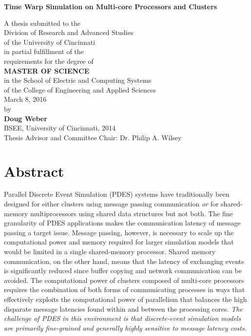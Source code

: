 \documentclass[11pt]{book}
\begin{document}
\thispagestyle{empty}

\doublespacing

\vspace*{0.5in}

\begin{center}
\LARGE{\textbf{Time Warp Simulation on Multi-core Processors and Clusters}}

\vspace*{0.4in}

  {\large A thesis submitted to the\\[0.20in]
    Division of Research and Advanced Studies\\
    of the University of Cincinnati\\[0.20in]
    in partial fulfillment of the\\
    requirements for the degree of\\[0.20in]
    \textbf{MASTER OF SCIENCE}\\[0.20in]
    in the School of Electric and Computing Systems\\
    of the College of Engineering and Applied Sciences\\[0.20in]
    March 8, 2016\\[0.20in]
    by\\[0.20in]
    \textbf{Doug Weber}\\
    BSEE, University of Cincinnati, 2014\\}
  \vspace{0.5in}
  {\large Thesis Advisor and Committee Chair:  Dr. Philip A. Wilsey}
\end{center}

\clearpage

\setcounter{page}{1}
\clearpage

\chapter*{Abstract}

Parallel Discrete Event Simulation (PDES) systems have traditionally been designed for either
clusters using message passing communication \emph{or} for shared-memory multiprocessors using
shared data structures but not both.  The fine granularity of PDES applications makes the
communication latency of message passing a target issue.  Message passing, however, is necessary to
scale up the computational power and memory required for larger simulation models that would be
limited in a single shared-memory processor.  Shared memory communication, on the other hand, means
that the latency of exchanging events is significantly reduced since buffer copying and network
communication can be avoided.  The computational power of clusters composed of multi-core processors
requires the combination of both forms of communicating processes in ways that effectively exploits
the computational power of parallelism that balances the high disparate message latencies found
within and between the processing cores.  \emph{The challenge of PDES in this environment is that
  discrete-event simulation models are primarily fine-grained and generally highly sensitive to
  message latency costs.}
\end{document}
